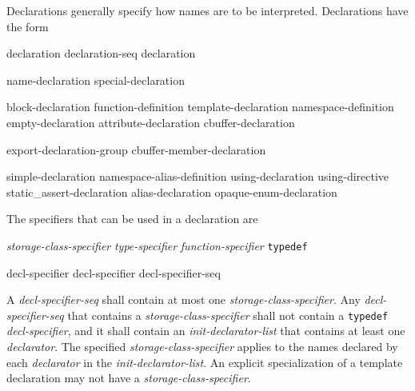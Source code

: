 \p Declarations generally specify how names are to be interpreted. Declarations have the form
\begin{grammar}
  \br
  declaration\br
  declaration-seq declaration\br

  \br
  name-declaration\br
  special-declaration\br

  \br
  block-declaration\br
  function-definition\br
  template-declaration\br
  namespace-definition\br
  empty-declaration\br
  attribute-declaration\br
  cbuffer-declaration\br

  \br
  export-declaration-group\br
  cbuffer-member-declaration\br

  \br
  simple-declaration\br
  namespace-alias-definition\br
  using-declaration\br
  using-directive\br
  static\_assert-declaration\br
  alias-declaration\br
  opaque-enum-declaration\br

  \br
  \terminal{;}

\end{grammar}

\p The specifiers that can be used in a declaration are
\begin{grammar}
  \br
  \textit{storage-class-specifier}\br
  \textit{type-specifier}\br
  \textit{function-specifier}\br
  \texttt{typedef}\br

  \br
  decl-specifier\br
  decl-specifier decl-specifier-seq\br
\end{grammar}


\begin{grammar}
\br
  \br
\end{grammar}

\p A \textit{decl-specifier-seq} shall contain at most one
\textit{storage-class-specifier}. Any \textit{decl-specifier-seq} that contains
a \textit{storage-class-specifier} shall not contain a \texttt{typedef}
\textit{decl-specifier}, and it shall contain an \textit{init-declarator-list}
that contains at least one \textit{declarator}. The specified
\textit{storage-class-specifier} applies to the names declared by each
\textit{declarator} in the \textit{init-declarator-list}. An explicit
specialization of a template declaration may not have a
\textit{storage-class-specifier}.

